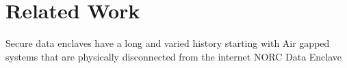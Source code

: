 \section{Related Work}

Secure data enclaves have a long and varied history starting with Air gapped systems that are physically
disconnected from the internet
NORC Data Enclave

